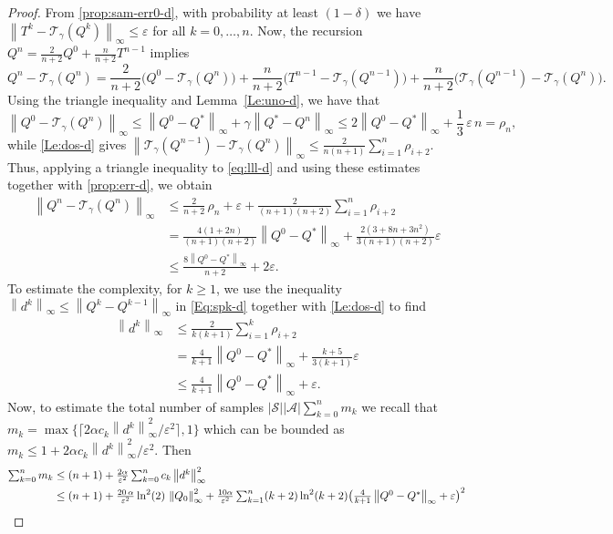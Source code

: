 \documentclass{article}
\newcommand{\cA}{\mathcal{A}}
\newcommand{\cS}{\mathcal{S}}
\newcommand{\T}{\mathcal{T}}
\newcommand*{\infn}[1]{\left\|{#1}\right\|_{\infty}}
\theoremstyle{plain}
\theoremstyle{definition}
\theoremstyle{remark}
\begin{document}
\begin{proof}
From \cref{prop:sam-err0-d}, with probability at least $(1-\delta)$ we have $\infn{T^k-\T_\gamma(Q^k)}\leq\varepsilon$ for all $k=0,\ldots,n$. Now, the recursion $Q^n=\frac{2}{n+2}Q^0+\frac{n}{n+2}T^{n-1}$ implies
 \begin{equation}\label{eq:lll-d}
    Q^n-\T_\gamma(Q^n)
    =\mbox{$\frac{2}{n+2}\big(Q^0-\T_\gamma(Q^n)\big)+ \frac{n}{n+2}\big(T^{n-1}-\T_\gamma(Q^{n-1})\big)+ \frac{n}{n+2} \big(\T_\gamma(Q^{n-1})-\T_\gamma(Q^n)\big)$}.
\end{equation}
Using the triangle inequality and Lemma~\ref{Le:uno-d}, we have that  
$$\infn{Q^0-\T_\gamma(Q^n)} \le \infn{Q^0-Q^*}+\gamma \infn{Q^*-Q^n} \le 2\infn{Q^0-Q^*}+\mbox{$\frac{1}{3}$}\,\varepsilon\,n =  \rho_n,$$ 
while \cref{Le:dos-d} gives $\infn{\T_\gamma(Q^{n-1})-\T_\gamma(Q^n)}\leq\frac{2}{n(n+1)}\sum_{i=1}^{n}\rho_{i+2}$. Thus, applying a triangle inequality to \eqref{eq:lll-d} and using these estimates together with \cref{prop:err-d}, we obtain 
\begin{align*}
    \infn{Q^n-\T_\gamma(Q^n)}&\le \mbox{$\frac{2}{n+2}\,\rho_n+ \varepsilon+\frac{2}{(n+1)(n+2)}\sum_{i=1}^{n}\rho_{i+2}$}
   \\& = \mbox{$\frac{4(1+2n)}{(n+1)(n+2)}\infn{Q^0-Q^*}+ \frac{2(3+8n+3n^2)}{3(n+1)(n+2)}\varepsilon$}
    \\& \le \mbox{$\frac{8\infn{Q^0-Q^*}}{n+2}+2\varepsilon$}.
\end{align*}
To estimate the complexity, for $k \ge 1$, we use the inequality $\infn{d^k}\le\infn{Q^k-Q^{k-1}}$ in \eqref{Eq:spk-d} together with \cref{Le:dos-d} to find
\begin{align*}
    \mbox{$\infn{d^k}$}&\leq\mbox{$\frac{2}{k(k+1)}\sum_{i=1}^{k}\rho_{i+2}$}\\
    &=\mbox{$\frac{4}{k+1}\infn{Q^0-Q^*}$} +\mbox{$\frac{k+5}{3(k+1)}\varepsilon$}\\
    &\leq \mbox{$\frac{4}{k+1}\infn{Q^0-Q^*}+\varepsilon$}.
\end{align*}
Now, to estimate the total number of samples $|\cS||\cA|\sum_{k=0}^n m_k$ 
we recall that $m_k=\max\{\lceil 2 \alpha c_k\infn{d^{k}}^2/\varepsilon^{2}\rceil,1\}$ which can be bounded as $m_k\leq 1+2\alpha c_k\infn{d^{k}}^2/\varepsilon^{2}$. Then 
\begin{align}
    \mbox{$\sum_{k=0}^nm_k$}&\leq\mbox{$ (n+1)+\frac{2\alpha}{\varepsilon^{2}}\sum_{k=0}^n c_k\infn{d^{k}}^2$} \nonumber\\
   &\leq\mbox{$ (n+1)+\frac{20\, \alpha}{\varepsilon^{2}} \ln^2(2)\,\infn{Q_0}^2+\frac{10\alpha}{\varepsilon^{2}}\sum_{k=1}^n (k+2)\ln^2(k+2)\big(\frac{4}{k+1}\infn{Q^0-Q^*}+\varepsilon\big)^2$} \nonumber\\

\end{align}
\end{proof}
\end{document}
